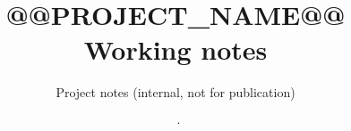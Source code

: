 \documentclass[11pt,a4paper]{article}
\title{@@PROJECT_NAME@@\\[2pt]\large Working notes}
\author{Project notes (internal, not for publication)}
\date{\NotesVersion\ · \NotesDate\\\small\NotesStatus}
\theoremstyle{plain}
\theoremstyle{definition}
\theoremstyle{remark}
\begin{document}
\maketitle
\linenumbers
\tableofcontents



% 
% 
\end{document}

